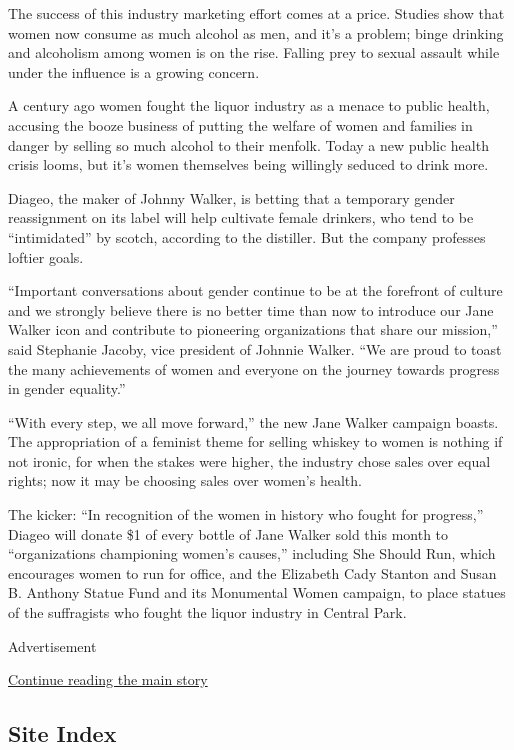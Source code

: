 The success of this industry marketing effort comes at a price. Studies
show that women now consume as much alcohol as men, and it's a problem;
binge drinking and alcoholism among women is on the rise. Falling prey
to sexual assault while under the influence is a growing concern.

A century ago women fought the liquor industry as a menace to public
health, accusing the booze business of putting the welfare of women and
families in danger by selling so much alcohol to their menfolk. Today a
new public health crisis looms, but it's women themselves being
willingly seduced to drink more.

Diageo, the maker of Johnny Walker, is betting that a temporary gender
reassignment on its label will help cultivate female drinkers, who tend
to be ``intimidated'' by scotch, according to the distiller. But the
company professes loftier goals.

``Important conversations about gender continue to be at the forefront
of culture and we strongly believe there is no better time than now to
introduce our Jane Walker icon and contribute to pioneering
organizations that share our mission,'' said Stephanie Jacoby, vice
president of Johnnie Walker. ``We are proud to toast the many
achievements of women and everyone on the journey towards progress in
gender equality.''

``With every step, we all move forward,'' the new Jane Walker campaign
boasts. The appropriation of a feminist theme for selling whiskey to
women is nothing if not ironic, for when the stakes were higher, the
industry chose sales over equal rights; now it may be choosing sales
over women's health.

The kicker: ``In recognition of the women in history who fought for
progress,'' Diageo will donate \$1 of every bottle of Jane Walker sold
this month to ``organizations championing women's causes,'' including
She Should Run, which encourages women to run for office, and the
Elizabeth Cady Stanton and Susan B. Anthony Statue Fund and its
Monumental Women campaign, to place statues of the suffragists who
fought the liquor industry in Central Park.

Advertisement

\protect\hyperlink{after-bottom}{Continue reading the main story}

\hypertarget{site-index}{%
\subsection{Site Index}\label{site-index}}

